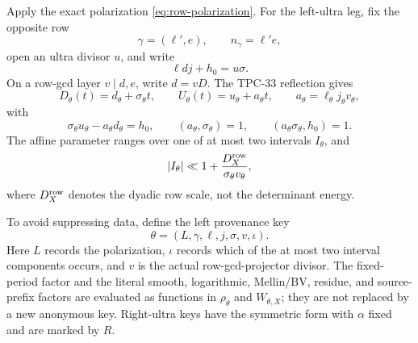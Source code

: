 Apply the exact polarization \eqref{eq:row-polarization}.  For the
left-ultra leg, fix the opposite row
\[
 \gamma=(\ell',e),\qquad n_\gamma=\ell'e,
\]
open an ultra divisor \(u\), and write
\[
 \ell d j+h_0=u\sigma.
\]
On a row-gcd layer \(v\mid d,e\), write \(d=vD\).  The TPC-33
reflection gives
\begin{equation}
 D_\theta(t)=d_\theta+\sigma_\theta t,\qquad
 U_\theta(t)=u_\theta+a_\theta t,\qquad
 a_\theta=\ell_\theta j_\theta v_\theta,
\label{eq:affine-native-forms}
\end{equation}
with
\begin{equation}
 \sigma_\theta u_\theta-a_\theta d_\theta=h_0,\qquad
 (a_\theta,\sigma_\theta)=1,\qquad
 (a_\theta\sigma_\theta,h_0)=1.
\label{eq:affine-native-determinant}
\end{equation}
The affine parameter ranges over one of at most two intervals
\(I_\theta\), and
\begin{equation}
 |I_\theta|\ll 1+\frac{D_X^{\rm row}}
 {\sigma_\theta v_\theta},
\label{eq:affine-native-length}
\end{equation}
where \(D_X^{\rm row}\) denotes the dyadic row scale, not the
determinant energy.

To avoid suppressing data, define the left provenance key
\begin{equation}
 \theta=
 (L,\gamma,\ell,j,\sigma,v,\iota).
\label{eq:affine-provenance-key}
\end{equation}
Here \(L\) records the polarization, \(\iota\) records which of the
at most two interval components occurs, and \(v\) is the actual
row-gcd-projector divisor.  The fixed-period factor and the literal
smooth, logarithmic, Mellin/BV, residue, and source-prefix factors
are evaluated as functions in \(\rho_\theta\) and
\(W_{\theta,X}\); they are not replaced by a new anonymous key.
Right-ultra keys have the symmetric form with \(\alpha\) fixed and
are marked by \(R\).

